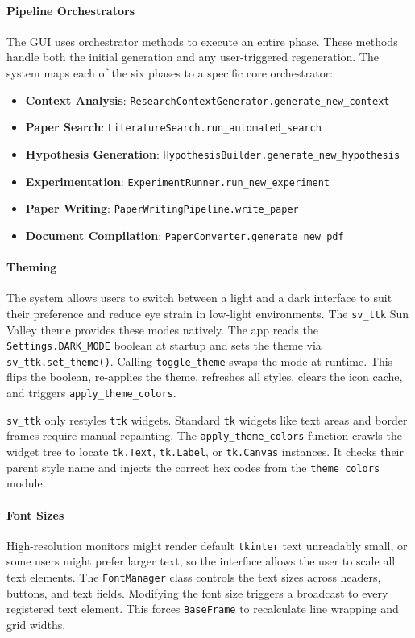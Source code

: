 \paragraph{Pipeline Orchestrators}
The GUI uses orchestrator methods to execute an entire phase.
These methods handle both the initial generation and any user-triggered regeneration.
The system maps each of the six phases to a specific core orchestrator:

\begin{itemize}[nosep]
	\item \textbf{Context Analysis}: \texttt{ResearchContextGenerator.generate\_new\_context}
	\item \textbf{Paper Search}: \texttt{LiteratureSearch.run\_automated\_search}
	\item \textbf{Hypothesis Generation}: \texttt{HypothesisBuilder.generate\_new\_hypothesis}
	\item \textbf{Experimentation}: \texttt{ExperimentRunner.run\_new\_experiment}
	\item \textbf{Paper Writing}: \texttt{PaperWritingPipeline.write\_paper}
	\item \textbf{Document Compilation}: \texttt{PaperConverter.generate\_new\_pdf}
\end{itemize}

\paragraph{Theming}
The system allows users to switch between a light and a dark interface to suit their preference and reduce eye strain in low-light environments.
The \texttt{sv\_ttk} Sun Valley theme provides these modes natively.
The app reads the \texttt{Settings.DARK\_MODE} boolean at startup and sets the theme via \texttt{sv\_ttk.set\_theme()}.
Calling \texttt{toggle\_theme} swaps the mode at runtime.
This flips the boolean, re-applies the theme, refreshes all styles, clears the icon cache, and triggers \texttt{apply\_theme\_colors}.

\texttt{sv\_ttk} only restyles \texttt{ttk} widgets.
Standard \texttt{tk} widgets like text areas and border frames require manual repainting.
The \texttt{apply\_theme\_colors} function crawls the widget tree to locate \texttt{tk.Text}, \texttt{tk.Label}, or \texttt{tk.Canvas} instances.
It checks their parent style name and injects the correct hex codes from the \texttt{theme\_colors} module.

\paragraph{Font Sizes}
High-resolution monitors might render default \texttt{tkinter} text unreadably small, or some users might prefer larger text, so the interface allows the user to scale all text elements.
The \texttt{FontManager} class controls the text sizes across headers, buttons, and text fields.
Modifying the font size triggers a broadcast to every registered text element.
This forces \texttt{BaseFrame} to recalculate line wrapping and grid widths.




